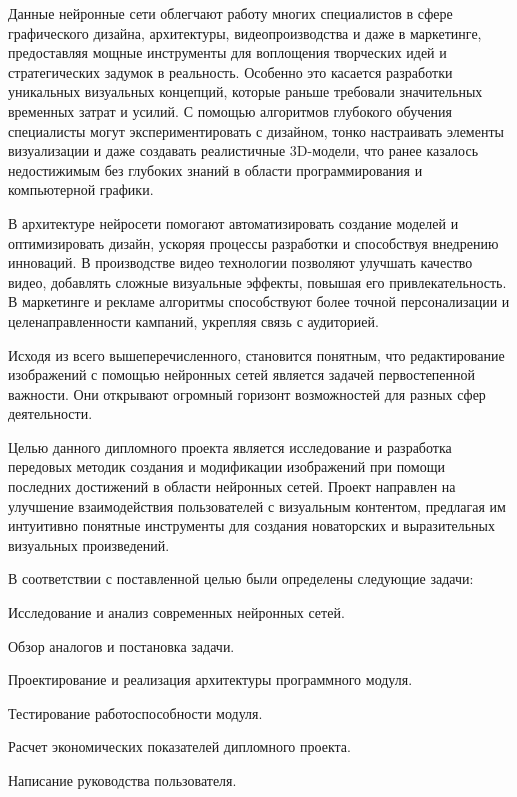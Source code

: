 Данные нейронные сети облегчают работу многих специалистов в сфере графического дизайна, архитектуры, видеопроизводства и даже в маркетинге, предоставляя мощные инструменты для воплощения творческих идей и стратегических задумок в реальность. Особенно это касается разработки уникальных визуальных концепций, которые раньше требовали значительных временных затрат и усилий. С помощью алгоритмов глубокого обучения специалисты могут экспериментировать с дизайном, тонко настраивать элементы визуализации и даже создавать реалистичные 3D-модели, что ранее казалось недостижимым без глубоких знаний в области программирования и компьютерной графики.

В архитектуре нейросети помогают автоматизировать создание моделей и оптимизировать дизайн, ускоряя процессы разработки и способствуя внедрению инноваций. В производстве видео технологии позволяют улучшать качество видео, добавлять сложные визуальные эффекты, повышая его привлекательность. В маркетинге и рекламе алгоритмы способствуют более точной персонализации и целенаправленности кампаний, укрепляя связь с аудиторией.

Исходя из всего вышеперечисленного, становится понятным, что редактирование изображений с помощью нейронных сетей является задачей первостепенной важности. Они открывают огромный горизонт возможностей для разных сфер деятельности.

Целью данного дипломного проекта является исследование и разработка передовых методик создания и модификации изображений при помощи последних достижений в области нейронных сетей. Проект направлен на улучшение взаимодействия пользователей с визуальным контентом, предлагая им интуитивно понятные инструменты для создания новаторских и выразительных визуальных произведений.

В соответствии с поставленной целью были определены следующие задачи:
\begin{enumerate_num}
    \item Исследование и анализ современных нейронных сетей.
    \item Обзор аналогов и постановка задачи.
    \item Проектирование и реализация архитектуры программного модуля.
    \item Тестирование работоспособности модуля.
    \item Расчет экономических показателей дипломного проекта.
    \item Написание руководства пользователя.
\end{enumerate_num}
